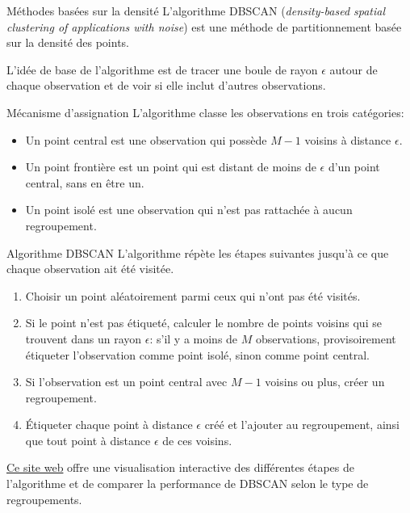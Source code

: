 \documentclass[
  ignorenonframetext,
]{beamer}
\providecommand{\tightlist}{%
  \setlength{\itemsep}{0pt}\setlength{\parskip}{0pt}}\usepackage{longtable,booktabs,array}
\begin{document}
\begin{frame}{Méthodes basées sur la densité}
\protect\hypertarget{muxe9thodes-basuxe9es-sur-la-densituxe9}{}
L'algorithme DBSCAN (\emph{density-based spatial clustering of
applications with noise}) est une méthode de partitionnement basée sur
la densité des points.

L'idée de base de l'algorithme est de tracer une boule de rayon
\(\epsilon\) autour de chaque observation et de voir si elle inclut
d'autres observations.
\end{frame}

\begin{frame}{Mécanisme d'assignation}
\protect\hypertarget{muxe9canisme-dassignation}{}
L'algorithme classe les observations en trois catégories:

\begin{itemize}
\tightlist
\item
  Un point central est une observation qui possède \(M-1\) voisins à
  distance \(\epsilon\).
\item
  Un point frontière est un point qui est distant de moins de
  \(\epsilon\) d'un point central, sans en être un.
\item
  Un point isolé est une observation qui n'est pas rattachée à aucun
  regroupement.
\end{itemize}
\end{frame}

\begin{frame}{Algorithme DBSCAN}
\protect\hypertarget{algorithme-dbscan}{}
L'algorithme répète les étapes suivantes jusqu'à ce que chaque
observation ait été visitée.

\begin{enumerate}
\tightlist
\item
  Choisir un point aléatoirement parmi ceux qui n'ont pas été visités.
\item
  Si le point n'est pas étiqueté, calculer le nombre de points voisins
  qui se trouvent dans un rayon \(\epsilon\): s'il y a moins de \(M\)
  observations, provisoirement étiqueter l'observation comme point
  isolé, sinon comme point central.
\item
  Si l'observation est un point central avec \(M-1\) voisins ou plus,
  créer un regroupement.
\item
  Étiqueter chaque point à distance \(\epsilon\) créé et l'ajouter au
  regroupement, ainsi que tout point à distance \(\epsilon\) de ces
  voisins.
\end{enumerate}

\href{https://www.naftaliharris.com/blog/visualizing-dbscan-clustering/}{Ce
site web} offre une visualisation interactive des différentes étapes de
l'algorithme et de comparer la performance de DBSCAN selon le type de
regroupements.
\end{frame}
\end{document}
